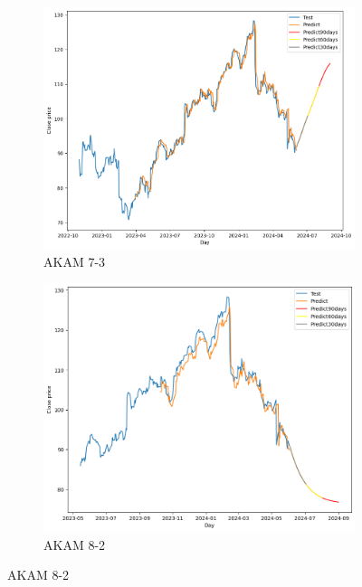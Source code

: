 \documentclass{ieeeojies}
\begin{document}
\begin{figure}[H]
    \centering
    \begin{subfigure}[b]{0.33\linewidth}
        \centering
        \includegraphics[width=\linewidth]{LSTM Plot/AKAM_LSTM_7_3.png}
        \caption{AKAM 7-3}
        \label{fig:akam-7-3}
    \end{subfigure}%
    \hfill
    \begin{subfigure}[b]{0.33\linewidth}
        \centering
        \includegraphics[width=\linewidth]{LSTM Plot/AKAM_LSTM_8_2.png}
        \caption{AKAM 8-2}
        \label{fig:akam-8-2}
    \end{subfigure}%

\end{figure}
\end{document}
